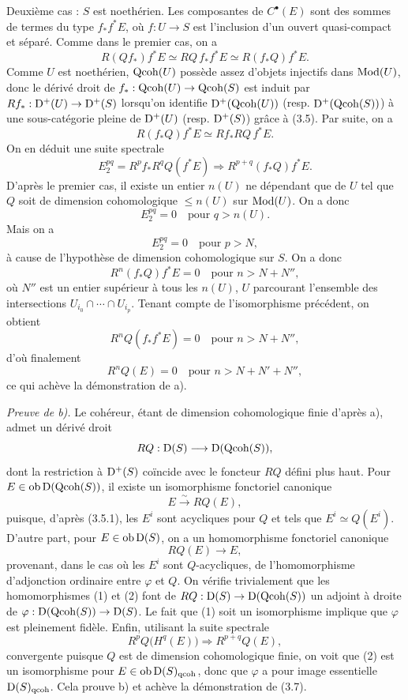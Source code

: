 \documentclass[11pt]{article}
\begin{document}
Deuxième cas : $S$ est noethérien. Les composantes de $C^\bullet(E)$ sont des sommes de termes du type $f_*f^*E$, où $f:U\to S$ est l'inclusion d'un ouvert quasi-compact et séparé. Comme dans le premier cas, on a
\[
R(Qf_*)f^*E\simeq RQ\,f_*f^*E\simeq R(f_*Q)f^*E.
\]
Comme $U$ est noethérien, $\operatorname{Qcoh}(U)$ possède assez d'objets injectifs dans $\operatorname{Mod}(U)$, donc le dérivé droit de $f_*:\operatorname{Qcoh}(U)\to\operatorname{Qcoh}(S)$ est induit par $Rf_*:\mathrm D^+(U)\to\mathrm D^+(S)$ lorsqu'on identifie $\mathrm D^+(\operatorname{Qcoh}(U))$ (resp. $\mathrm D^+(\operatorname{Qcoh}(S))$) à une sous-catégorie pleine de $\mathrm D^+(U)$ (resp. $\mathrm D^+(S)$) grâce à (3.5). Par suite, on a
\[
R(f_*Q)f^*E\simeq Rf_*RQ\,f^*E.
\]
On en déduit une suite spectrale
\[
E_2^{pq}=R^pf_*R^qQ(f^*E)\Longrightarrow R^{p+q}(f_*Q)f^*E.
\]
D'après le premier cas, il existe un entier $n(U)$ ne dépendant que de $U$ tel que $Q$ soit de dimension cohomologique $\leq n(U)$ sur $\operatorname{Mod}(U)$. On a donc
\[
E_2^{pq}=0\quad\text{pour }q>n(U).
\]
Mais on a
\[
E_2^{pq}=0\quad\text{pour }p>N,
\]
à cause de l'hypothèse de dimension cohomologique sur $S$. On a donc
\[
R^n(f_*Q)f^*E=0\quad\text{pour }n>N+N'',
\]
où $N''$ est un entier supérieur à tous les $n(U)$, $U$ parcourant l'ensemble des intersections $U_{i_0}\cap\cdots\cap U_{i_p}$. Tenant compte de l'isomorphisme précédent, on obtient
\[
R^nQ(f_*f^*E)=0\quad\text{pour }n>N+N'',
\]
d'où finalement
\[
R^nQ(E)=0\quad\text{pour }n>N+N'+N'',
\]
ce qui achève la démonstration de a).

\emph{Preuve de b).} Le cohéreur, étant de dimension cohomologique finie d'après a), admet un dérivé droit
\[
RQ:\mathrm D(S)\longrightarrow\mathrm D(\operatorname{Qcoh}(S)),
\]
dont la restriction à $\mathrm D^+(S)$ coïncide avec le foncteur $RQ$ défini plus haut. Pour $E\in\operatorname{ob}\mathrm D(\operatorname{Qcoh}(S))$, il existe un isomorphisme fonctoriel canonique
\begin{equation}\tag{1}
E\xrightarrow{\sim} RQ(E),
\end{equation}
puisque, d'après (3.5.1), les $E^i$ sont acycliques pour $Q$ et tels que $E^i\simeq Q(E^i)$. D'autre part, pour $E\in\operatorname{ob}\mathrm D(S)$, on a un homomorphisme fonctoriel canonique
\begin{equation}\tag{2}
RQ(E)\longrightarrow E,
\end{equation}
provenant, dans le cas où les $E^i$ sont $Q$-acycliques, de l'homomorphisme d'adjonction ordinaire entre $\varphi$ et $Q$. On vérifie trivialement que les homomorphismes (1) et (2) font de $RQ:\mathrm D(S)\to\mathrm D(\operatorname{Qcoh}(S))$ un adjoint à droite de $\varphi:\mathrm D(\operatorname{Qcoh}(S))\to\mathrm D(S)$. Le fait que (1) soit un isomorphisme implique que $\varphi$ est pleinement fidèle. Enfin, utilisant la suite spectrale
\[
R^pQ\bigl(H^q(E)\bigr)\Longrightarrow R^{p+q}Q(E),
\]
convergente puisque $Q$ est de dimension cohomologique finie, on voit que (2) est un isomorphisme pour $E\in\operatorname{ob}\mathrm D(S)_{\mathrm{qcoh}}$, donc que $\varphi$ a pour image essentielle $\mathrm D(S)_{\mathrm{qcoh}}$. Cela prouve b) et achève la démonstration de (3.7).
\end{document}
